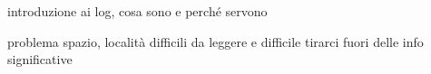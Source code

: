 introduzione ai log, cosa sono e perch\'{e} servono


problema spazio, 
località
difficili da leggere e difficile tirarci fuori delle info significative